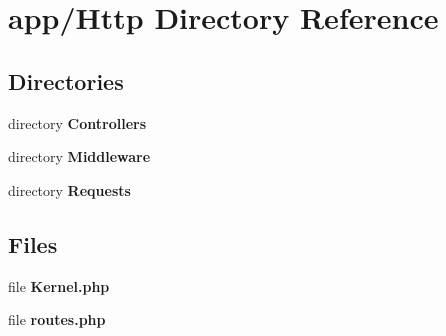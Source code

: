 \section{app/\+Http Directory Reference}
\label{dir_16436ad1332f6fed2b1f670d0aec75f6}
\subsection*{Directories}
\begin{DoxyCompactItemize}
\item 
directory {\bf Controllers}
\item 
directory {\bf Middleware}
\item 
directory {\bf Requests}
\end{DoxyCompactItemize}
\subsection*{Files}
\begin{DoxyCompactItemize}
\item 
file {\bf Kernel.\+php}
\item 
file {\bf routes.\+php}
\end{DoxyCompactItemize}
